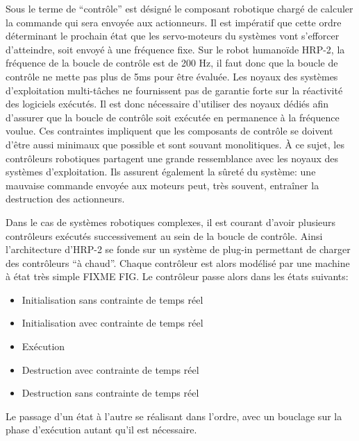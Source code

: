 Sous le terme de ``contrôle'' est désigné le composant robotique
chargé de calculer la commande qui sera envoyée aux actionneurs. Il
est impératif que cette ordre déterminant le prochain état que les
servo-moteurs du systèmes vont s'efforcer d'atteindre, soit envoyé à
une fréquence fixe. Sur le robot humanoïde HRP-2, la fréquence de la
boucle de contrôle est de 200 Hz, il faut donc que la boucle de
contrôle ne mette pas plus de 5ms pour être évaluée. Les noyaux des
systèmes d'exploitation multi-tâches ne fournissent pas de garantie
forte sur la réactivité des logiciels exécutés. Il est donc nécessaire
d'utiliser des noyaux dédiés afin d'assurer que la boucle de contrôle
soit exécutée en permanence à la fréquence voulue. Ces contraintes
impliquent que les composants de contrôle se doivent d'être aussi
minimaux que possible et sont souvant monolitiques. À ce sujet, les
contrôleurs robotiques partagent une grande ressemblance avec les
noyaux des systèmes d'exploitation. Ils assurent également la sûreté
du système: une mauvaise commande envoyée aux moteurs peut, très
souvent, entraîner la destruction des actionneurs.

Dans le cas de systèmes robotiques complexes, il est courant d'avoir
plusieurs contrôleurs exécutés successivement au sein de la boucle de
contrôle. Ainsi l'architecture d'HRP-2 se fonde sur un système de
plug-in permettant de charger des contrôleurs ``à chaud''. Chaque
contrôleur est alors modélisé par une machine à état très simple FIXME
FIG. Le contrôleur passe alors dans les états suivants:

\begin{itemize}
\item Initialisation sans contrainte de temps réel
\item Initialisation avec contrainte de temps réel
\item Exécution
\item Destruction avec contrainte de temps réel
\item Destruction sans contrainte de temps réel
\end{itemize}

Le passage d'un état à l'autre se réalisant dans l'ordre, avec un
bouclage sur la phase d'exécution autant qu'il est nécessaire.


